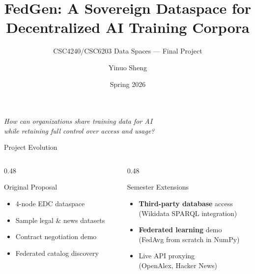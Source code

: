 \documentclass[aspectratio=1610, 11pt]{beamer}
\title[FedGen]{FedGen: A Sovereign Dataspace for\\Decentralized AI Training Corpora}
\subtitle{CSC4240/CSC6203 Data Spaces --- Final Project}
\author{Yinuo Sheng \quad 122090461}
\date{Spring 2026}
\institute{}
\begin{document}
\begin{frame}[plain]
\titlepage
\begin{center}
\small\textit{How can organizations share training data for AI\\while retaining full control over access and usage?}
\end{center}
\end{frame}

\begin{frame}{Project Evolution}
\begin{columns}[T]
\begin{column}{0.48\textwidth}
\begin{block}{Original Proposal}
\begin{itemize}
  \item 4-node EDC dataspace
  \item Sample legal \& news datasets
  \item Contract negotiation demo
  \item Federated catalog discovery
\end{itemize}
\end{block}
\end{column}
\begin{column}{0.48\textwidth}
\begin{alertblock}{Semester Extensions}
\begin{itemize}
  \item[\textcolor{edcorange}{\textbf{+}}] \textbf{Third-party database} access\\(Wikidata SPARQL integration)
  \item[\textcolor{edcorange}{\textbf{+}}] \textbf{Federated learning} demo\\(FedAvg from scratch in NumPy)
  \item[\textcolor{edcorange}{\textbf{+}}] Live API proxying\\(OpenAlex, Hacker News)
\end{itemize}
\end{alertblock}
\end{column}
\end{columns}
\vspace{0.5em}
\begin{center}
\end{center}
\end{frame}
\end{document}
